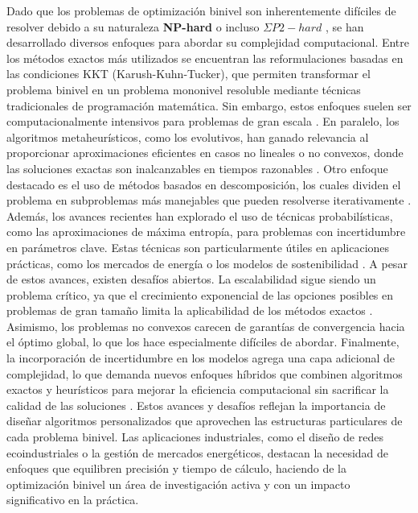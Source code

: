Dado que los problemas de optimización binivel son inherentemente difíciles de resolver debido a su naturaleza \textbf{NP-hard} \cite{Jeroslow1985ThePHNP,jonathan_f__bard_1991NP}
o incluso $\Sigma P2-hard$ \cite{phdthesisCerulli,DempeyZemkoho2020},
se han desarrollado diversos enfoques para abordar su complejidad computacional. Entre los métodos exactos más utilizados se encuentran las reformulaciones basadas en las condiciones KKT (Karush-Kuhn-Tucker), que permiten transformar el problema binivel en un problema mononivel resoluble mediante técnicas tradicionales de programación matemática.
Sin embargo, estos enfoques suelen ser computacionalmente intensivos para problemas de gran escala \cite{phdthesisCerulli}.
En paralelo, los algoritmos metaheurísticos, como los evolutivos, han ganado relevancia al proporcionar aproximaciones eficientes en casos no lineales o no convexos, donde las soluciones exactas son inalcanzables en tiempos razonables \cite{Sinha2017ARO}.
Otro enfoque destacado es el uso de métodos basados en descomposición, los cuales dividen el problema en subproblemas más manejables que pueden resolverse iterativamente \cite{Floudas1990ACO}.
Además, los avances recientes han explorado el uso de técnicas probabilísticas, como las aproximaciones de máxima entropía, para problemas con incertidumbre en parámetros clave.
Estas técnicas son particularmente útiles en aplicaciones prácticas, como los mercados de energía o los modelos de sostenibilidad \cite{SadddiquiNaturalGasSOS1}.
A pesar de estos avances, existen desafíos abiertos. La escalabilidad sigue siendo un problema crítico, ya que el crecimiento exponencial de las opciones posibles en problemas de gran tamaño limita la aplicabilidad de los métodos exactos \cite{DempeyZemkoho2020}.
Asimismo, los problemas no convexos carecen de garantías de convergencia hacia el óptimo global, lo que los hace especialmente difíciles de abordar. Finalmente, la incorporación de incertidumbre en los modelos agrega una capa adicional de complejidad, lo que demanda nuevos enfoques híbridos que combinen algoritmos exactos y heurísticos para mejorar la eficiencia computacional sin sacrificar la calidad de las soluciones \cite{phdthesisCerulli,Sinha2017ARO}. Estos avances y desafíos reflejan la importancia de diseñar algoritmos personalizados que aprovechen las estructuras particulares de cada problema binivel. Las aplicaciones industriales, como el diseño de redes ecoindustriales o la gestión de mercados energéticos, destacan la necesidad de enfoques que equilibren precisión y tiempo de cálculo, haciendo de la optimización binivel un área de investigación activa y con un impacto significativo en la práctica.